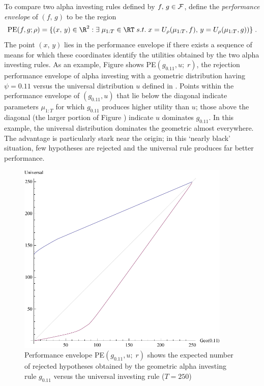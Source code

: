 \documentclass[12pt]{article}
\begin{document}
 To compare two alpha investing rules defined by $f,\,g \in {\cal F}$, define
 the {\em performance envelope} of $(f,\,g)$ to be the region
 \begin{equation}
    \mbox{PE}(f,g;\rho) = \{(x,\,y) \in \R^2: \exists \; \mu_{1:T} \in \RT \; s.t. \; 
                     x = U_\rho(\mu_{1:T},f),\,  y=U_\rho(\mu_{1:T},g))\} \;.
 \label{eq:PE}
 \end{equation}
 The point $(x,\,y)$ lies in the performance envelope if there exists a sequence
 of means for which these coordinates identify the utilities obtained by the two
 alpha investing rules.  As an example, Figure  shows PE$(g_{0.11},u;\;
 r)$, the rejection performance envelope of alpha investing with a geometric
 distribution having $\psi = 0.11$ versus the universal distribution $u$ defined
 in .  Points within the performance envelope of $(g_{0.11},u)$ that lie
 below the diagonal indicate parameters $\mu_{1:T}$ for which $g_{0.11}$ produces
 higher utility than $u$; those above the diagonal (the larger portion of Figure
 ) indicate $u$ dominates $g_{0.11}$. In this example, the universal
 distribution dominates the geometric almost everywhere.  The advantage is
 particularly stark near the origin; in this `nearly black' situation, few
 hypotheses are rejected and the universal rule produces far better performance.


 \begin{figure}
 \caption{ \label{fi:pe} Performance envelope PE$(g_{0.11},u;\;r)$ shows the
 expected number of rejected hypotheses obtained by the geometric alpha
 investing rule $g_{0.11}$ versus the universal investing rule ($T=250$)}
 \centerline{ \includegraphics[width=4in]{envelope} }
 \end{figure}
\end{document}

